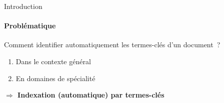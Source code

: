 
\begin{frame}{Introduction}\framesubtitle{Problématique}
  Comment identifier automatiquement les termes-clés d'un document~?
  \begin{enumerate}
    \item{Dans le contexte général}
    \item{En domaines de spécialité}
  \end{enumerate}

  \vspace{1em}

  \large\textbf{$\Rightarrow$ Indexation (automatique) par termes-clés}
\end{frame}

